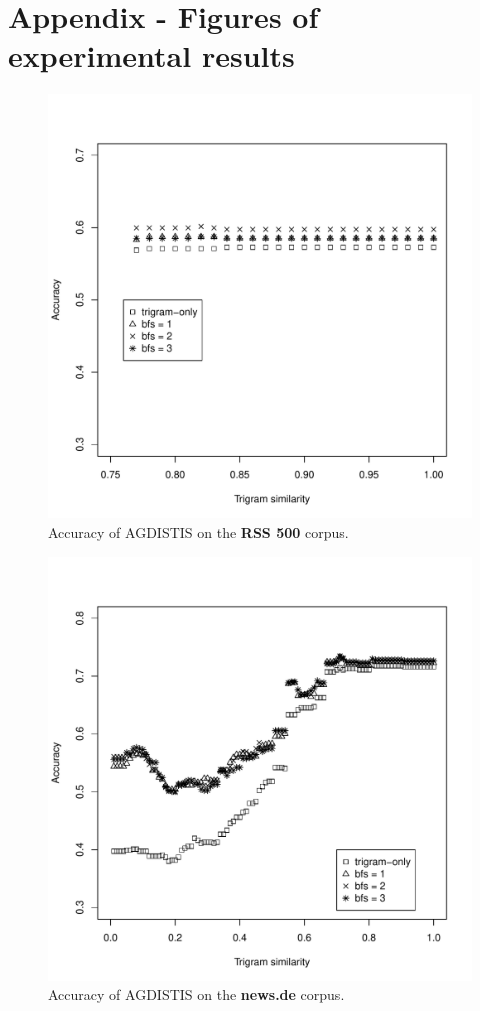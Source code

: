 \documentclass[11pt,letterpaper]{article}
\begin{document}
\section*{Appendix - Figures of experimental results}
\begin{figure}[htb!]
    \centering
        \includegraphics[width=\linewidth]{fig/500news.pdf}
    \caption{Accuracy of AGDISTIS on the \textbf{RSS 500} corpus.}\label{fig:RSS500}
\end{figure}
\begin{figure}[htb!]    
    \centering  
         \includegraphics[width=\linewidth]{fig/german.pdf}
    \caption{Accuracy of AGDISTIS on the \textbf{news.de} corpus.}\label{fig:german} 
\end{figure}
\end{document}
